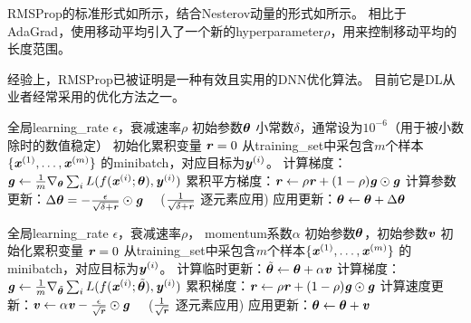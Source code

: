 
RMSProp的标准形式如所示，结合Nesterov动量的形式如所示。
相比于AdaGrad，使用移动平均引入了一个新的\gls{hyperparameter}$\rho$，用来控制移动平均的长度范围。


经验上，RMSProp已被证明是一种有效且实用的\gls{DNN}优化算法。
目前它是\gls{DL}从业者经常采用的优化方法之一。


\begin{algorithm}[ht]
\caption{RMSProp算法}
\label{alg:rms_prop}
\begin{algorithmic}
\REQUIRE 全局\gls{learning_rate} $\epsilon$，衰减速率$\rho$
\REQUIRE  初始参数$\boldsymbol{\theta}$
\REQUIRE 小常数$\delta$，通常设为$10^{-6}$（用于被小数除时的数值稳定）
\STATE 初始化累积变量 $\boldsymbol{\mathit{r}} = 0$
    \STATE 从\gls{training_set}中采包含$m$个样本$\{ \boldsymbol{\mathit{x}}^{(1)},\dots, \boldsymbol{\mathit{x}}^{(m)}\}$ 的\gls{minibatch}，对应目标为$\boldsymbol{\mathit{y}}^{(i)}$。
    \STATE 计算梯度：$\boldsymbol{\mathit{g}} \leftarrow  
         \frac{1}{m} \nabla_{\boldsymbol{\theta}} \sum_i L(f(\boldsymbol{\mathit{x}}^{(i)};\boldsymbol{\theta}),\boldsymbol{\mathit{y}}^{(i)})$ 
    \STATE 累积平方梯度：$\boldsymbol{\mathit{r}} \leftarrow \rho
    \boldsymbol{\mathit{r}} + (1-\rho) \boldsymbol{\mathit{g}} \odot \boldsymbol{\mathit{g}}$
    \STATE 计算参数更新：$\Delta \boldsymbol{\theta} =
    -\frac{\epsilon}{\sqrt{\delta + \boldsymbol{\mathit{r}}}} \odot \boldsymbol{\mathit{g}}$  \ \  ($\frac{1}{\sqrt{\delta + \boldsymbol{\mathit{r}}}}$ 逐元素应用)
    \STATE 应用更新：$\boldsymbol{\theta} \leftarrow \boldsymbol{\theta} + \Delta \boldsymbol{\theta}$
\ENDWHILE
\end{algorithmic}
\end{algorithm}

\begin{algorithm}[ht]
\caption{使用Nesterov\,\gls{momentum}的RMSProp算法}
\label{alg:rms_nesterov}
\begin{algorithmic}
\REQUIRE 全局\gls{learning_rate} $\epsilon$，衰减速率$\rho$， \gls{momentum}系数$\alpha$
\REQUIRE 初始参数$\boldsymbol{\theta}$，初始参数$\boldsymbol{\mathit{v}}$
\STATE 初始化累积变量 $\boldsymbol{\mathit{r}} = 0$
    \STATE 从\gls{training_set}中采包含$m$个样本$\{ \boldsymbol{\mathit{x}}^{(1)},\dots, \boldsymbol{\mathit{x}}^{(m)}\}$ 的\gls{minibatch}，对应目标为$\boldsymbol{\mathit{y}}^{(i)}$。
    \STATE 计算临时更新：$\tilde{\boldsymbol{\theta}} \leftarrow \boldsymbol{\theta} + \alpha \boldsymbol{\mathit{v}}$
    \STATE 计算梯度：$\boldsymbol{\mathit{g}} \leftarrow  
         \frac{1}{m} \nabla_{\tilde{\boldsymbol{\theta}}} \sum_i L(f(\boldsymbol{\mathit{x}}^{(i)};\tilde{\boldsymbol{\theta}}),\boldsymbol{\mathit{y}}^{(i)})$ 
    \STATE  累积梯度：$\boldsymbol{\mathit{r}} \leftarrow \rho
    \boldsymbol{\mathit{r}} + (1-\rho) \boldsymbol{\mathit{g}} \odot \boldsymbol{\mathit{g}}$
    \STATE  计算速度更新：$\boldsymbol{\mathit{v}} \leftarrow \alpha \boldsymbol{\mathit{v}}
    -\frac{\epsilon}{\sqrt{\boldsymbol{\mathit{r}}}} \odot \boldsymbol{\mathit{g}}$ \ \  ($\frac{1}{\sqrt{\boldsymbol{\mathit{r}}}}$ 逐元素应用)
    \STATE 应用更新：$\boldsymbol{\theta} \leftarrow \boldsymbol{\theta} + \boldsymbol{\mathit{v}}$
\ENDWHILE
\end{algorithmic}
\end{algorithm}


